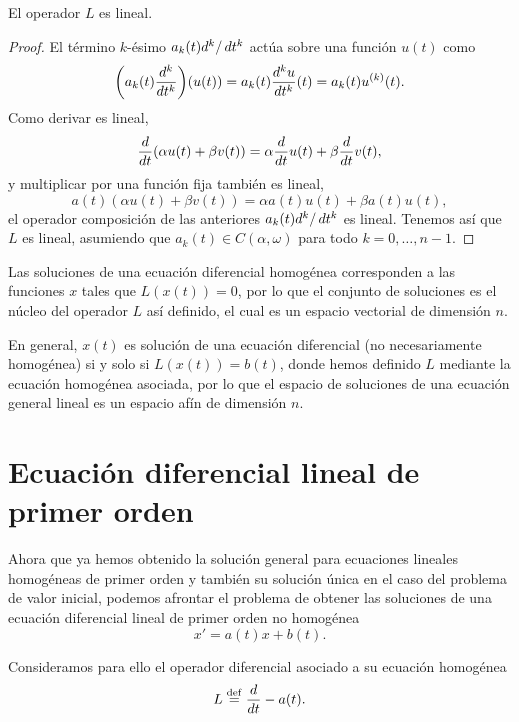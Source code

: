 \documentclass[../ecuaciones_diferenciales.tex]{subfiles}
\begin{document}
\begin{proposition}
	El operador \(L\) es lineal.
\end{proposition}

\begin{proof}
	El término \(k\)-ésimo \(a_k(t) d^k/\mathop{d\!} t^k\) actúa sobre una
	función \(u(t)\) como
	\[\left(a_k(t)\frac{d^k}{\dif t^k}\right)(u(t)) = a_k(t) 
		\frac{d^ku}{\dif t^k}(t) = a_k(t) u^{(k)}(t).\]
	Como derivar es lineal,
	\[\frac{d}{\mathop{d\!} t} (\alpha u(t) + \beta v(t))
		= \alpha \frac{d}{\mathop{d\!} t} u(t) + \beta \frac{d}{\mathop{d\!} t} v(t),\]
	y multiplicar por una función fija también es lineal,
	\[a(t)(\alpha u(t) + \beta v(t)) = \alpha a(t) u(t) + \beta a(t) u(t),\]
	el operador composición de las anteriores \(a_k(t) d^k/\mathop{d\!} t^k\) es
	lineal. Tenemos así que \(L\) es lineal, asumiendo que
	\(a_k(t) \in C(\alpha, \omega)\) para todo \(k=0, \dots, n-1\).
\end{proof}

\begin{remark}
	Las soluciones de una ecuación diferencial homogénea corresponden a las
    funciones \(x\) tales que \(L(x(t)) = 0\), por lo que el conjunto de
    soluciones es el núcleo del operador \(L\) así definido, el cual es un 
	espacio vectorial de dimensión \(n\).
\end{remark}

\begin{remark}
	En general, \(x(t)\) es solución de una ecuación diferencial (no
    necesariamente homogénea) si y solo si \(L(x(t)) = b(t)\), donde hemos
    definido \(L\) mediante la ecuación homogénea asociada, por lo que el
    espacio de soluciones de una ecuación general lineal es un espacio afín de
    dimensión \(n\).
\end{remark}

\section{Ecuación diferencial lineal de primer orden}

Ahora que ya hemos obtenido la solución general para
ecuaciones lineales homogéneas de primer orden y también su solución única en el
caso del problema de valor inicial, podemos afrontar el
problema de obtener las soluciones de una ecuación diferencial lineal de primer
orden no homogénea
\[x' = a(t)x + b(t).\]

Consideramos para ello el operador diferencial asociado a su ecuación homogénea
\[L \overset{\operatorname{def}}{=} \frac{d}{\mathop{d\!} t} - a(t).\]
\end{document}
